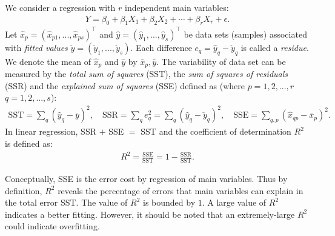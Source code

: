 \begin{definition}\label{def:R}
	We consider a regression with $r$ independent main variables:
	\begin{align}\label{RegressionModel}
		Y = \beta_0 + \beta_1 X_1 + \beta_2 X_2 + \cdots + \beta_r X_r + \epsilon.
	\end{align}
	Let $\hat{x}_p = (\hat{x}_{p1},...,\hat{x}_{ps})^{\top}$ and $\hat{y} = (\hat{y}_1,...,\hat{y}_s)^{\top}$ be data sets (samples) associated with \emph{fitted values} $\check{y} = (\check{y}_1,...,\check{y}_s)$. Each difference $e_q = \hat{y}_q - \check{y}_q$ is called a \emph{residue}. We denote the mean of $\hat{x}_p$ and $\hat{y}$ by $\bar{x}_p, \bar{y}$. The variability of data set can be measured by the \emph{total sum of squares} (SST), the \emph{sum of squares of residuals} (SSR) and the \emph{explained sum of squares} (SSE) defined as (where $p=1,2,...,r$ $q=1,2,...,s$):
	\begin{align}
		\text{SST} = \sum_q (\hat{y}_q - \bar{y})^2, \quad
		\text{SSR} = \sum_q e_q^2 = \sum_q (\hat{y}_q - \check{y}_q)^2, \quad
		\text{SSE} = \sum_{q,p} (\hat{x}_{qp} - \bar{x}_p)^2.
	\end{align}
	In linear regression, SSR $+$ SSE $=$ SST and the coefficient of determination $R^2$ is defined as:
	\begin{align}
		R^2 = \frac{\text{SSE}}{\text{SST}} = 1 - \frac{\text{SSR}}{\text{SST}}.
	\end{align}
\end{definition}

Conceptually, SSE is the error cost by regression of main variables. Thus by definition, $R^2$ reveals the percentage of errors that main variables can explain in the total error SST. The value of $R^2$ is bounded by $1$. A large value of $R^2$ indicates a better fitting. However, it should be noted that an extremely-large $R^2$ could indicate overfitting.

